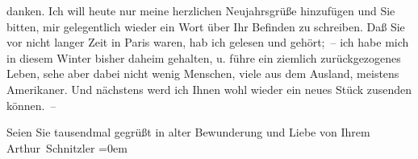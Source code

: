                danken. Ich will heute nur meine herzlichen Neujahrsgrüße hinzufügen und Sie bitten,
               mir gelegentlich wieder ein Wort über Ihr Befinden zu schreiben. Daß Sie vor nicht
               langer Zeit in Paris waren, hab ich gelesen und
               gehört; – ich habe mich in diesem Winter bisher daheim gehalten, u. {\pb}führe ein ziemlich zurückgezogenes Leben, sehe
               aber dabei nicht wenig Menschen, viele aus dem Ausland, meistens Amerikaner. Und nächstens werd ich Ihnen wohl wieder ein neues
               Stück zusenden können. –\pend
           
\pstart
           Seien Sie tausendmal gegrüßt in alter Bewunderung und Liebe von Ihrem{\\[\baselineskip]}\spacefill\mbox{Arthur Schnitzler}\pend
           \leftskip=0em{}\endnumbering{}  \newcommand{\dateiname}{L02407}\newcommand{\titel}{Arthur Schnitzler an Georg Brandes, 4. 1. 1924}\newcommand{\editorInnen}{Martin Anton Müller und Gerd-Hermann Susen}
